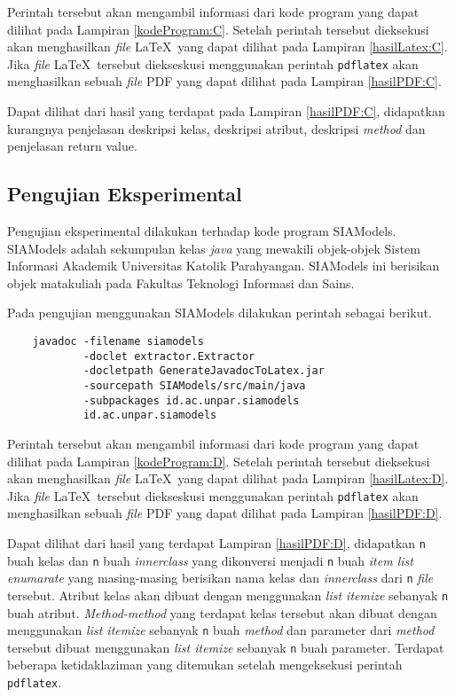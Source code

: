 Perintah tersebut akan mengambil informasi dari kode program yang dapat dilihat pada Lampiran \ref{kodeProgram:C}. Setelah perintah tersebut dieksekusi akan menghasilkan {\it file} \LaTeX\ yang dapat dilihat pada Lampiran \ref{hasilLatex:C}. Jika {\it file} \LaTeX\ tersebut diekseskusi menggunakan perintah {\tt pdflatex} akan menghasilkan sebuah {\it file} PDF yang dapat dilihat pada Lampiran \ref{hasilPDF:C}.

Dapat dilihat dari hasil yang terdapat pada Lampiran \ref{hasilPDF:C}, didapatkan kurangnya penjelasan deskripsi kelas, deskripsi atribut, deskripsi {\it method} dan penjelasan {return value}.

\subsection{Pengujian Eksperimental}
\label{sec:pengujian eksperimental}
Pengujian eksperimental dilakukan terhadap kode program SIAModels. SIAModels adalah sekumpulan kelas {\it java} yang mewakili objek-objek Sistem Informasi Akademik Universitas Katolik Parahyangan. SIAModels ini berisikan objek matakuliah pada Fakultas Teknologi Informasi dan Sains.

Pada pengujian menggunakan SIAModels dilakukan perintah sebagai berikut.

\begin{verbatim}
	javadoc -filename siamodels
	        -doclet extractor.Extractor
	        -docletpath GenerateJavadocToLatex.jar
	        -sourcepath SIAModels/src/main/java
	        -subpackages id.ac.unpar.siamodels
	        id.ac.unpar.siamodels
\end{verbatim}

Perintah tersebut akan mengambil informasi dari kode program yang dapat dilihat pada Lampiran \ref{kodeProgram:D}. Setelah perintah tersebut dieksekusi akan menghasilkan {\it file} \LaTeX\ yang dapat dilihat pada Lampiran \ref{hasilLatex:D}. Jika {\it file} \LaTeX\ tersebut diekseskusi menggunakan perintah {\tt pdflatex} akan menghasilkan sebuah {\it file} PDF yang dapat dilihat pada Lampiran \ref{hasilPDF:D}.

Dapat dilihat dari hasil yang terdapat Lampiran \ref{hasilPDF:D}, didapatkan {\tt n} buah kelas dan {\tt n} buah {\it innerclass} yang dikonversi menjadi {\tt n} buah {\it item list enumarate} yang masing-masing berisikan nama kelas dan {\it innerclass} dari {\tt n} {\it file} tersebut. Atribut kelas akan dibuat dengan menggunakan {\it list itemize} sebanyak {\tt n} buah atribut. {\it Method-method} yang terdapat kelas tersebut akan dibuat dengan menggunakan {\it list itemize} sebanyak {\tt n} buah {\it method} dan parameter dari {\it method} tersebut dibuat menggunakan {\it list itemize} sebanyak {\tt n} buah parameter. Terdapat beberapa ketidaklaziman yang ditemukan setelah mengeksekusi perintah {\tt pdflatex}.

